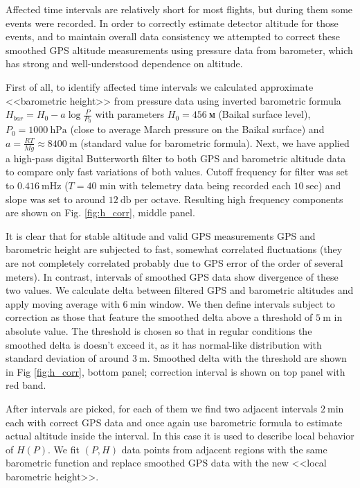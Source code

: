 \documentclass[final,5p,times,twocolumn]{elsarticle}
\begin{document}
Affected time intervals are relatively short for most flights, but during them some events were recorded. In order to correctly estimate detector altitude for those events, and to maintain overall data consistency we attempted to correct these smoothed GPS altitude measurements using pressure data from barometer, which has strong and well-understood dependence on altitude.

First of all, to identify affected time intervals we calculated approximate <<barometric height>> from pressure data using inverted barometric formula $H_{bar} = H_0 - a \log \frac{P}{P_0}$ with parameters $H_0 = 456~\textrm{м}$ (Baikal surface level), $P_0 = 1000~\textrm{hPa}$ (close to average March pressure on the Baikal surface) and $a = \frac{RT}{Mg} \approx 8400~\textrm{m}$ (standard value for barometric formula). Next, we have applied a high-pass digital Butterworth filter to both GPS and barometric altitude data to compare only fast variations of both values. Cutoff frequency for filter was set to $0.416~\textrm{mHz}$ ($T=40$ min with telemetry data being recorded each $10~\textrm{sec}$) and slope was set to around $12~\textrm{db per octave}$. Resulting high frequency components are shown on Fig. \ref{fig:h_corr}, middle panel.

It is clear that for stable altitude and valid GPS measurements GPS and barometric height are subjected to fast, somewhat correlated fluctuations (they are not completely correlated probably due to GPS error of the order of several meters). In contrast, intervals of smoothed GPS data show divergence of these two values. We calculate delta between filtered GPS and barometric altitudes and apply moving average with $6~\textrm{min}$ window. We then define intervals subject to correction as those that feature the smoothed delta above a threshold of $5~\textrm{m}$ in absolute value. The threshold is chosen so that in regular conditions the smoothed delta is doesn't exceed it, as it has normal-like distribution with standard deviation of around $3~\textrm{m}$. Smoothed delta with the threshold are shown in Fig \ref{fig:h_corr}, bottom panel; correction interval is shown on top panel with red band.

After intervals are picked, for each of them we find two adjacent intervals $2~\textrm{min}$ each with correct GPS data and once again use barometric formula to estimate actual altitude inside the interval. In this case it is used to describe local behavior of $H(P)$. We fit $(P, H)$ data points from adjacent regions with the same barometric function and replace smoothed GPS data with the new <<local barometric height>>.
\end{document}

